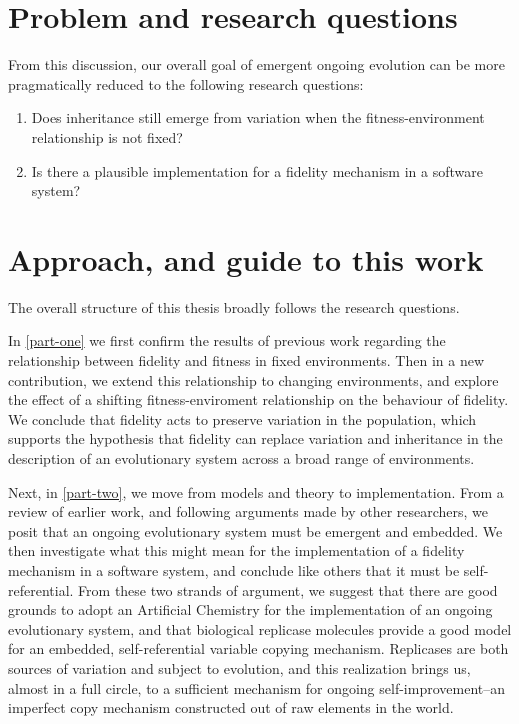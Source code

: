 \documentclass[]{report}
\begin{document}
\section{Problem and research questions}\label{research-questions}

From this discussion, our overall goal of emergent ongoing evolution can be more pragmatically reduced to the following research questions:

\begin{enumerate}
	\item Does inheritance still emerge from variation when the fitness-environment relationship is not fixed?
	\item Is there a plausible implementation for a fidelity mechanism in a software system?
\end{enumerate}

\section{Approach, and guide to this work}

The overall structure of this thesis broadly follows the research questions. 

In \ref{part-one} we first confirm the results of previous work regarding the relationship between fidelity and fitness in fixed environments. Then in a new contribution, we extend this relationship to changing environments, and explore the effect of a shifting fitness-enviroment relationship on the behaviour of fidelity. We conclude that fidelity acts to preserve variation in the population, which supports the hypothesis that fidelity can replace variation and inheritance in the description of an evolutionary system across a broad range of environments.

Next, in \ref{part-two}, we move from models and theory to implementation. From a review of earlier work, and following arguments made by other researchers, we posit that an ongoing evolutionary system must be emergent and embedded. We then investigate what this might mean for the implementation of a fidelity mechanism in a software system, and conclude like others that it must be self-referential. From these two strands of argument, we suggest that there are good grounds to adopt an Artificial Chemistry for the implementation of an ongoing evolutionary system, and that biological replicase molecules provide a good model for an embedded, self-referential variable copying mechanism. Replicases are both sources of variation and subject to evolution, and this realization brings us, almost in a full circle, to a sufficient mechanism for ongoing self-improvement--an imperfect copy mechanism constructed out of raw elements in the world.
\end{document}
